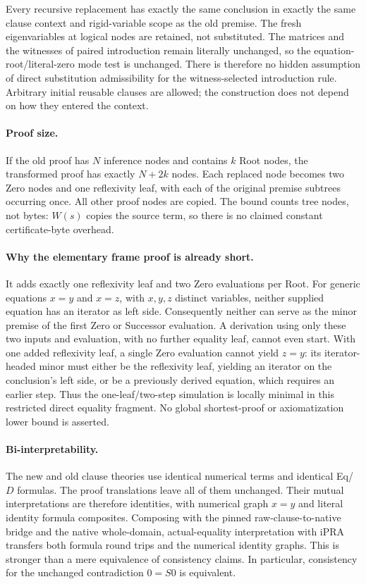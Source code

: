 Every recursive replacement has exactly the same conclusion in exactly
the same clause context and rigid-variable scope as the old premise.
The fresh eigenvariables at logical nodes are retained, not substituted.
The matrices and the witnesses of paired introduction remain literally
unchanged, so the equation-root/literal-zero mode test is unchanged.
There is therefore no hidden assumption of direct substitution
admissibility for the witness-selected introduction rule.  Arbitrary
initial reusable clauses are allowed; the construction does not depend
on how they entered the context.

\paragraph{Proof size.}
If the old proof has $N$ inference nodes and contains $k$ Root nodes,
the transformed proof has exactly $N+2k$ nodes.  Each replaced node
becomes two Zero nodes and one reflexivity leaf, with each of the
original premise subtrees occurring once.  All other proof nodes are
copied.  The bound counts tree nodes, not bytes: $W(s)$ copies the
source term, so there is no claimed constant certificate-byte overhead.

\paragraph{Why the elementary frame proof is already short.}
It adds exactly one reflexivity leaf and two Zero evaluations per
Root.  For generic equations $x=y$ and $x=z$, with $x,y,z$ distinct
variables, neither supplied equation has an iterator as left side.
Consequently neither can serve as the minor premise of the first
Zero or Successor evaluation.  A derivation using only these two
inputs and evaluation, with no further equality leaf, cannot even
start.  With one added reflexivity leaf, a single Zero evaluation
cannot yield $z=y$: its iterator-headed minor must either be the
reflexivity leaf, yielding an iterator on the conclusion's left side,
or be a previously derived equation, which requires an earlier step.
Thus the one-leaf/two-step simulation is locally minimal in this
restricted direct equality fragment.  No global shortest-proof or
axiomatization lower bound is asserted.

\paragraph{Bi-interpretability.}
The new and old clause theories use identical numerical terms and
identical Eq/$D$ formulas.  The proof translations leave all of them
unchanged.  Their mutual interpretations are therefore identities,
with numerical graph $x=y$ and literal identity formula composites.
Composing with the pinned raw-clause-to-native bridge and the native
whole-domain, actual-equality interpretation with iPRA transfers both
formula round trips and the numerical identity graphs.  This is
stronger than a mere equivalence of consistency claims.  In particular,
consistency for the unchanged contradiction $0=S0$ is equivalent.

